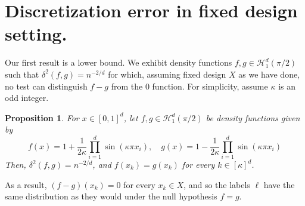 \documentclass{article}
\newcommand{\1}{\mathbb{I}}
\theoremstyle{alden}
\theoremstyle{aldenthm}
\newtheorem{proposition}{Proposition}
\theoremstyle{definition}
\theoremstyle{remark}
\begin{document}
\section{Discretization error in fixed design setting.}
Our first result is a lower bound. We exhibit density functions $f,g \in \mathcal{H}_1^{d}(\pi/2)$ such that $\delta^2(f,g) = n^{-2/d}$ for which, assuming fixed design $X$ as we have done, no test can distinguish $f - g$ from the $0$ function. For simplicity, assume $\kappa$ is an odd integer.
\begin{proposition}
	\label{prop: discretization_error}
	For $x \in [0,1]^d$, let $f,g \in \mathcal{H}_1^d(\pi/2)$ be density functions given by
	\begin{equation*}
	f(x) = 1 + \frac{1}{2\kappa}\prod_{i = 1}^{d} \sin(\kappa \pi x_i), \quad g(x) = 1 - \frac{1}{2\kappa}\prod_{i = 1}^{d} \sin(\kappa \pi x_i)
	\end{equation*}
	Then, $\delta^2(f,g) = n^{-2/d}$, and $f(x_k) = g(x_k)$ for every $k \in [\kappa]^d$.
\end{proposition}
As a result, $(f - g)(x_k) = 0$ for every $x_k \in X$, and so the labels $\ell$ have the same distribution as they would under the null hypothesis $f = g$. 
\end{document}
